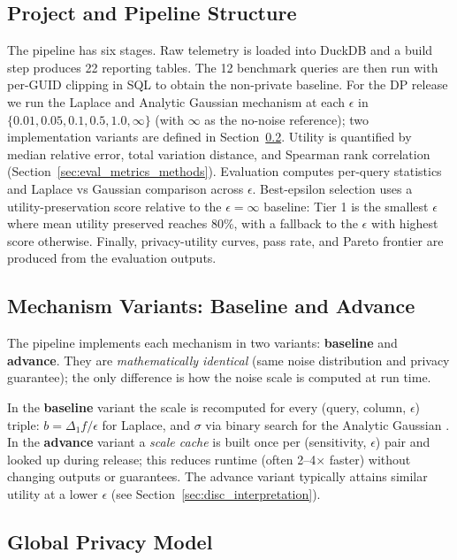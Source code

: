\documentclass[12pt,letterpaper]{article}
\begin{document}
\subsection{Project and Pipeline Structure}
\label{sec:project_structure}

The pipeline has six stages. Raw telemetry is loaded into DuckDB and a build step produces 22 reporting tables. The 12 benchmark queries are then run with per-GUID clipping in SQL to obtain the non-private baseline. For the DP release we run the Laplace and Analytic Gaussian mechanism at each $\epsilon$ in $\{0.01, 0.05, 0.1, 0.5, 1.0, \infty\}$ (with $\infty$ as the no-noise reference); two implementation variants are defined in Section~\ref{sec:mechanism_variants}. Utility is quantified by median relative error, total variation distance, and Spearman rank correlation (Section~\ref{sec:eval_metrics_methods}). Evaluation computes per-query statistics and Laplace vs Gaussian comparison across $\epsilon$. Best-epsilon selection uses a utility-preservation score relative to the $\epsilon = \infty$ baseline: Tier 1 is the smallest $\epsilon$ where mean utility preserved reaches 80\%, with a fallback to the $\epsilon$ with highest score otherwise. Finally, privacy-utility curves, pass rate, and Pareto frontier are produced from the evaluation outputs.

\subsection{Mechanism Variants: Baseline and Advance}
\label{sec:mechanism_variants}

The pipeline implements each mechanism in two variants: \textbf{baseline} and \textbf{advance}. They are \emph{mathematically identical} (same noise distribution and privacy guarantee); the only difference is how the noise scale is computed at run time.

In the \textbf{baseline} variant the scale is recomputed for every (query, column, $\epsilon$) triple: $b = \Delta_1 f / \epsilon$ for Laplace, and $\sigma$ via binary search for the Analytic Gaussian \cite{balle2018improving}. In the \textbf{advance} variant a \emph{scale cache} is built once per (sensitivity, $\epsilon$) pair and looked up during release; this reduces runtime (often 2--4$\times$ faster) without changing outputs or guarantees. The advance variant typically attains similar utility at a lower $\epsilon$ (see Section~\ref{sec:disc_interpretation}).

\subsection{Global Privacy Model}
\label{sec:global_model}
\end{document}
